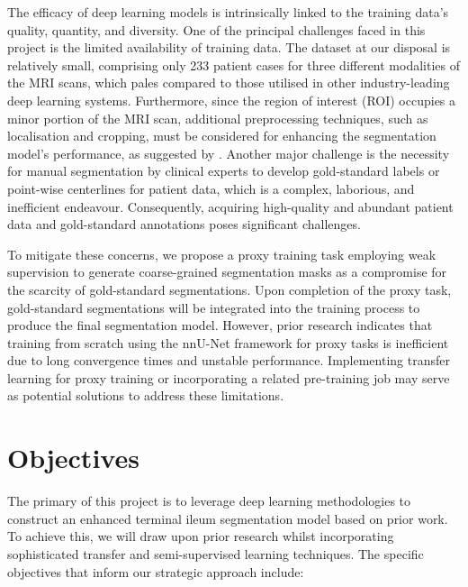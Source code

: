 The efficacy of deep learning models is intrinsically linked to the training data's quality, quantity, and diversity. One of the principal challenges faced in this project is the limited availability of training data. The dataset at our disposal is relatively small, comprising only 233 patient cases for three different modalities of the MRI scans, which pales compared to those utilised in other industry-leading deep learning systems. Furthermore, since the region of interest (ROI) occupies a minor portion of the MRI scan, additional preprocessing techniques, such as localisation and cropping, must be considered for enhancing the segmentation model's performance, as suggested by \cite{Ali2022}. Another major challenge is the necessity for manual segmentation by clinical experts to develop gold-standard labels or point-wise centerlines for patient data, which is a complex, laborious, and inefficient endeavour. Consequently, acquiring high-quality and abundant patient data and gold-standard annotations poses significant challenges.

To mitigate these concerns, we propose a proxy training task employing weak supervision to generate coarse-grained segmentation masks as a compromise for the scarcity of gold-standard segmentations. Upon completion of the proxy task, gold-standard segmentations will be integrated into the training process to produce the final segmentation model. However, prior research \cite{Ali2022} indicates that training from scratch using the nnU-Net framework for proxy tasks is inefficient due to long convergence times and unstable performance. Implementing transfer learning for proxy training \cite{jang2021effectiveness} or incorporating a related pre-training job may serve as potential solutions to address these limitations.

\section{Objectives}

The primary of this project is to leverage deep learning methodologies to construct an enhanced terminal ileum segmentation model based on prior work. To achieve this, we will draw upon prior research whilst incorporating sophisticated transfer and semi-supervised learning techniques. The specific objectives that inform our strategic approach include:


